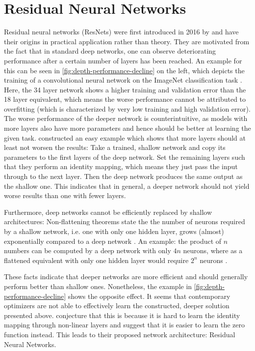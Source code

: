 \section{Residual Neural Networks}
\label{sec:neural-networks}

Residual neural networks (ResNets) were first introduced in 2016 by \citet{he16} and have their origins in practical application rather than theory.
They are motivated from the fact that in standard deep networks, one can observe deteriorating performance after a certain number of layers has been reached.
An example for this can be seen in \cref{fig:depth-performance-decline} on the left, which depicts the training of a convolutional neural network on the ImageNet classification task \cite{deng09}.
Here, the 34 layer network shows a higher training and validation error than the 18 layer equivalent, which means the worse performance cannot be attributed to overfitting (which is characterized by very low training and high validation error). 
The worse performance of the deeper network is counterintuitive, as models with more layers also have more parameters and hence should be better at learning the given task.
\citet{he16} constructed an easy example which shows that more layers should at least not worsen the results:
Take a trained, shallow network and copy its parameters to the first layers of the deep network.
Set the remaining layers such that they perform an identity mapping, which means they just pass the input through to the next layer.
Then the deep network produces the same output as the shallow one.
This indicates that in general, a deeper network should not yield worse results than one with fewer layers.

Furthermore, deep networks cannot be efficiently replaced by shallow architectures:
Non-flattening theorems state the the number of neurons required by a shallow network, i.e. one with only one hidden layer, grows (almost) exponentially compared to a deep network \cite{lin17,delalleau11}.
An example: the product of $n$ numbers can be computed by a deep network with only $4n$ neurons, where as a flattened equivalent with only one hidden layer would require $2^n$ neurons \cite{lin17}.



These facts indicate that deeper networks are more efficient and should generally perform better than shallow ones.
Nonetheless, the example in \cref{fig:depth-performance-decline} shows the opposite effect.
It seems that contemporary optimizers are not able to effectively learn the constructed, deeper solution presented above.
\citet{he16} conjecture that this is because it is hard to learn the identity mapping through non-linear layers and suggest that it is easier to learn the zero function instead.
This leads to their proposed network architecture: Residual Neural Networks.

